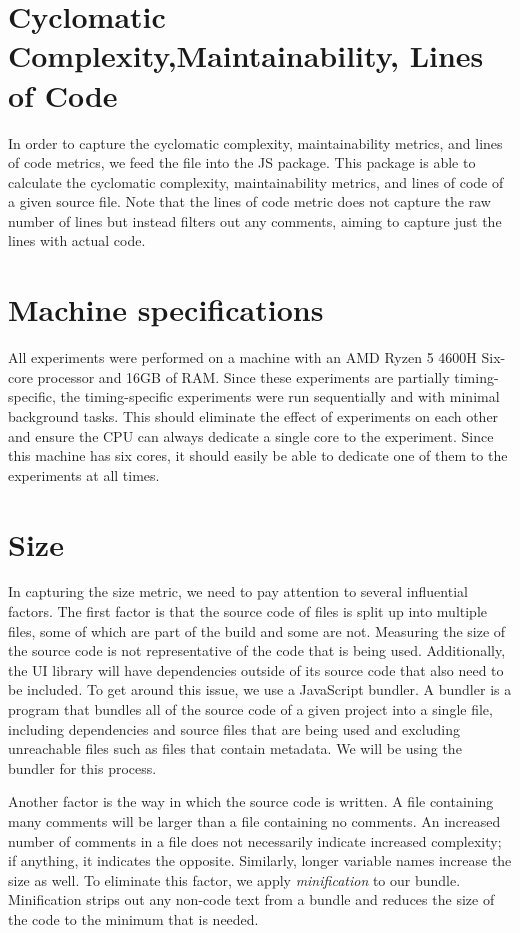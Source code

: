 \section{Cyclomatic Complexity,Maintainability, Lines of Code}
In order to capture the cyclomatic complexity, maintainability metrics, and lines of code metrics, we feed the file into the  JS package. This package is able to calculate the cyclomatic complexity, maintainability metrics, and lines of code of a given source file. Note that the lines of code metric does not capture the raw number of lines but instead filters out any comments, aiming to capture just the lines with actual code.

\section{Machine specifications}\label{sec:experimental-setup:machine-specs}
All experiments were performed on a machine with an AMD Ryzen 5 4600H Six-core processor and 16GB of RAM. Since these experiments are partially timing-specific, the timing-specific experiments were run sequentially and with minimal background tasks. This should eliminate the effect of experiments on each other and ensure the CPU can always dedicate a single core to the experiment. Since this machine has six cores, it should easily be able to dedicate one of them to the experiments at all times.

\section{Size}\label{sec:experimental-setup:size}
In capturing the size metric, we need to pay attention to several influential factors. The first factor is that the source code of files is split up into multiple files, some of which are part of the build and some are not. Measuring the size of the source code is not representative of the code that is being used. Additionally, the UI library will have dependencies outside of its source code that also need to be included. To get around this issue, we use a JavaScript bundler. A bundler is a program that bundles all of the source code of a given project into a single file, including dependencies and source files that are being used and excluding unreachable files such as files that contain metadata. We will be using the  bundler for this process.

Another factor is the way in which the source code is written. A file containing many comments will be larger than a file containing no comments. An increased number of comments in a file does not necessarily indicate increased complexity; if anything, it indicates the opposite. Similarly, longer variable names increase the size as well. To eliminate this factor, we apply \emph{minification} to our bundle. Minification strips out any non-code text from a bundle and reduces the size of the code to the minimum that is needed.

